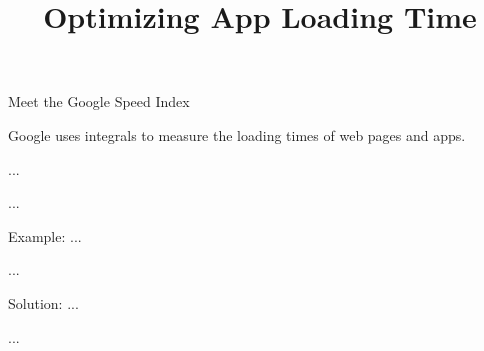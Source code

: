 \documentclass[10pt,aspectratio=1610,xcolor={dvipsnames}]{beamer}
\title{Optimizing App Loading Time}
\begin{document}
  \begin{frame}
    \titlepage
  \end{frame}

  \begin{frame}{Meet the Google Speed Index}

    Google uses integrals to measure the loading times of web pages and apps.

  \end{frame}

  \begin{frame}{...}

    ...

  \end{frame}

  \begin{frame}{Example: ...}

    ...

  \end{frame}

  \begin{frame}{Solution: ...}

    ...

  \end{frame}
\end{document}

